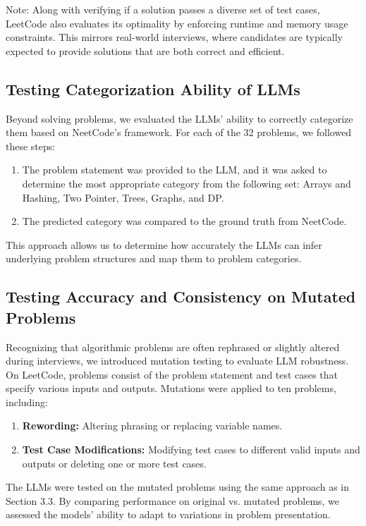 \documentclass[times, 10pt,twocolumn]{article}
\begin{document}
Note: Along with verifying if a solution passes a diverse set of test cases, LeetCode also evaluates its optimality by enforcing runtime and memory usage constraints. This mirrors real-world interviews, where candidates are typically expected to provide solutions that are both correct and efficient.

\subsection{Testing Categorization Ability of LLMs}
Beyond solving problems, we evaluated the LLMs' ability to correctly categorize them based on NeetCode's framework. For each of the 32 problems, we followed these steps:

\begin{enumerate}
    \item The problem statement was provided to the LLM, and it was asked to determine the most appropriate category from the following set: Arrays and Hashing, Two Pointer, Trees, Graphs, and DP.
    \item The predicted category was compared to the ground truth from NeetCode.
\end{enumerate}

This approach allows us to determine how accurately the LLMs can infer underlying problem structures and map them to problem categories.

\subsection{Testing Accuracy and Consistency on Mutated Problems}

Recognizing that algorithmic problems are often rephrased or slightly altered during interviews, we introduced mutation testing to evaluate LLM robustness. On LeetCode, problems consist of the problem statement and test cases that specify various inputs and outputs. Mutations were applied to ten problems, including:
\begin{enumerate}
    \item \textbf{Rewording:} Altering phrasing or replacing variable names.
    \item \textbf{Test Case Modifications:} Modifying test cases to different valid inputs and outputs or deleting one or more test cases.
\end{enumerate}

The LLMs were tested on the mutated problems using the same approach as in Section 3.3. By comparing performance on original vs. mutated problems, we assessed the models' ability to adapt to variations in problem presentation.
\end{document}
